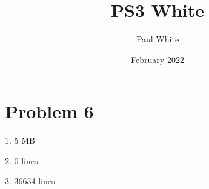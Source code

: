 \documentclass{article}
\title{PS3 White}
\author{Paul White}
\date{February 2022}
\begin{document}
\maketitle

\section{Problem 6}

1. 5 MB

2. 0 lines

3. 36634 lines
\end{document}
